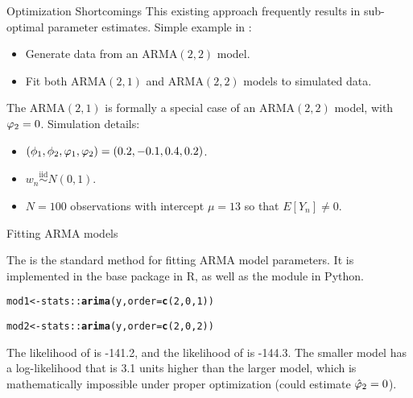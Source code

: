 \documentclass[aspectratio=169]{beamer}\usepackage[]{graphicx}\usepackage[]{xcolor}
\makeatletter
\newcommand{\hlnum}[1]{\textcolor[rgb]{0.686,0.059,0.569}{#1}}%
\newcommand{\hlopt}[1]{\textcolor[rgb]{0,0,0}{#1}}%
\newcommand{\hldef}[1]{\textcolor[rgb]{0.345,0.345,0.345}{#1}}%
\newcommand{\hlkwb}[1]{\textcolor[rgb]{0.69,0.353,0.396}{#1}}%
\newcommand{\hlkwc}[1]{\textcolor[rgb]{0.333,0.667,0.333}{#1}}%
\newcommand{\hlkwd}[1]{\textcolor[rgb]{0.737,0.353,0.396}{\textbf{#1}}}%
\newenvironment{kframe}{%
 \def\at@end@of@kframe{}%
 \ifinner\ifhmode%
  \def\at@end@of@kframe{\end{minipage}}%
  \begin{minipage}{\columnwidth}%
 \fi\fi%
 \def\FrameCommand##1{\hskip\@totalleftmargin \hskip-\fboxsep
 \colorbox{shadecolor}{##1}\hskip-\fboxsep
     \hskip-\linewidth \hskip-\@totalleftmargin \hskip\columnwidth}%
 \MakeFramed {\advance\hsize-\width
   \@totalleftmargin\z@ \linewidth\hsize
   \@setminipage}}%
 {\par\unskip\endMakeFramed%
 \at@end@of@kframe}
\newenvironment{knitrout}{}{} %
\makeatother
\begin{document}
\begin{frame}{Optimization Shortcomings}
This existing approach frequently results in sub-optimal parameter estimates. Simple example in : 
\begin{itemize}
  \item Generate data from an $\mathrm{ARMA}(2, 2)$ model.
  \item Fit both $\mathrm{ARMA}(2, 1)$ and $\mathrm{ARMA}(2, 2)$ models to simulated data.
\end{itemize}
The $\mathrm{ARMA}(2, 1)$ is formally a special case of an $\mathrm{ARMA}(2, 2)$ model, with $\varphi_2 = 0$. \pause
Simulation details: 
\begin{itemize}
  \item $(\phi_1, \phi_2, \varphi_1, \varphi_2) = (0.2, -0.1, 0.4, 0.2)$.
  \item $w_n \overset{\text{iid}}{\sim} N(0, 1)$. 
  \item $N = 100$ observations with intercept $\mu = 13$ so that $E[Y_n] \neq 0$.
\end{itemize}



\end{frame}

\begin{frame}{Fitting ARMA models}

The \citet{gardner1980} is the standard method for fitting $\mathrm{ARMA}$ model parameters. It is implemented in the base  package in R, as well as the  module in Python.

\begin{knitrout}
\color{fgcolor}\begin{kframe}
\begin{alltt}
\hldef{mod1} \hlkwb{<-} \hldef{stats}\hlopt{::}\hlkwd{arima}\hldef{(y,} \hlkwc{order} \hldef{=} \hlkwd{c}\hldef{(}\hlnum{2}\hldef{,} \hlnum{0}\hldef{,} \hlnum{1}\hldef{))}

\hldef{mod2} \hlkwb{<-} \hldef{stats}\hlopt{::}\hlkwd{arima}\hldef{(y,} \hlkwc{order} \hldef{=} \hlkwd{c}\hldef{(}\hlnum{2}\hldef{,} \hlnum{0}\hldef{,} \hlnum{2}\hldef{))}
\end{alltt}
\end{kframe}
\end{knitrout}

\pause 
The likelihood of  is -141.2, and the likelihood of  is -144.3. The \alert{smaller} model has a log-likelihood that is 3.1 units \alert{higher} than the larger model, which is mathematically impossible under proper optimization (could estimate $\hat{\varphi}_2 = 0$).
\end{frame}
\end{document}
